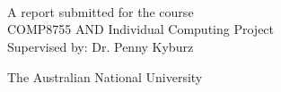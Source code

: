 \begin{titlepage}
  \enlargethispage{2cm}
  \begin{center}
    \makeatletter
    \Huge\textbf{\@title} \\[.4cm]
    \Huge\textbf{\thesisqualifier} \\[2.5cm]
    \huge\textbf{\@author} \\[9cm]
    \makeatother
    \LARGE A report submitted for the course \\
    COMP8755 AND Individual Computing Project \\
    Supervised by: Dr. Penny Kyburz
    
    The Australian National University \\[2cm]
    \thismonth

    \vspace*{\fill}
    \makeatletter
        {\selectfont\textcopyright}\ \@author{} \number\year
        \makeatother
    
  \end{center}
\end{titlepage}
